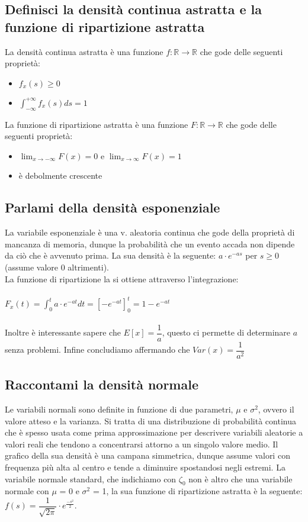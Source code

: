 \documentclass[a4paper,12pt]{report}
\begin{document}
	\subsection{Definisci la densità continua astratta e la funzione di ripartizione astratta}
	La densità continua astratta è una funzione $f : \mathbb{R} \rightarrow \mathbb{R}$ che gode delle seguenti proprietà: 
	\begin{itemize}
		\item $f_x(s) \geq 0$
		\item $\int_{-\infty}^{+\infty}f_x(s)ds = 1$
	\end{itemize}
	La funzione di ripartizione astratta è una funzione $F : \mathbb{R} \rightarrow \mathbb{R}$ che gode delle seguenti proprietà:
	\begin{itemize}
		\item $\lim_{x \rightarrow -\infty}F(x) = 0$ e $\lim_{x \rightarrow \infty}F(x) = 1$
		\item è debolmente crescente
	\end{itemize}
	\subsection{Parlami della densità esponenziale}
	La variabile esponenziale è una v. aleatoria continua che gode della proprietà di mancanza di memoria, dunque la probabilità che un evento accada non dipende da ciò che è avvenuto prima.
	La sua densità è la seguente: $a \cdot e^{-as}$ per $s \geq 0$  (assume valore 0 altrimenti). \\
	La funzione di ripartizione la si ottiene attraverso l'integrazione: \\\\
	$F_x(t) = \int_{0}^{t}a \cdot e^{-at}dt = [-e^{-at}]_{0}^{t} = 1 - e^{-at}$ \\\\
	Inoltre è interessante sapere che $E[x] = \dfrac{1}{a}$, questo ci permette di determinare $a$ senza problemi. Infine concludiamo affermando che $Var(x) = \dfrac{1}{a^2}$
	\subsection{Raccontami la densità normale}
	Le variabili normali sono definite in funzione di due parametri, $\mu$ e $\sigma^2$, ovvero il valore atteso e la varianza. Si tratta di una distribuzione di probabilità continua che è spesso usata come
	prima approssimazione per descrivere variabili aleatorie a valori reali che tendono a
	concentrarsi attorno a un singolo valore medio. Il grafico della sua densità è una campana simmetrica, dunque assume valori con frequenza più alta al centro e tende a diminuire spostandosi negli estremi. La variabile normale standard, che indichiamo con $\zeta_{0}$ non è altro che una variabile normale con $\mu$ = 0 e $\sigma^2$ = 1, la sua funzione di ripartizione astratta è la seguente: $f(s) = \dfrac{1}{\sqrt{2 \pi}} \cdot e^{\tfrac{-s^2}{2}}$.
\end{document}
